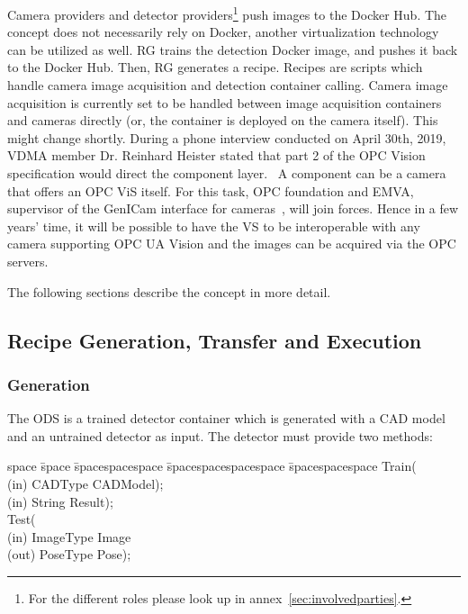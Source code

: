 Camera providers and detector providers\footnote{For the different roles please look up in annex~\ref{sec:involvedparties}.} push images to the Docker Hub.  The concept does not necessarily rely on Docker, another virtualization technology can be utilized as well. RG trains the detection Docker image, and pushes it back to the Docker Hub. Then, RG generates a recipe. Recipes are scripts which handle camera image acquisition and detection container calling. Camera image acquisition is currently set to be handled between image acquisition containers and cameras directly (or, the container is deployed on the camera itself). This might change shortly. During a phone interview conducted on April 30th, 2019, VDMA member Dr. Reinhard Heister stated that part 2 of the OPC Vision specification would direct the component layer.~\cite{Heister2019TheInterview} A component can be a camera that offers an OPC ViS itself. For this task, OPC foundation and EMVA, supervisor of the GenICam interface for cameras~\cite{EMVA2019GenICam2019}, will join forces. Hence in a few years' time, it will be possible to have the VS to be interoperable with any camera supporting OPC UA Vision and the images can be acquired via the OPC servers.

The following sections describe the concept in more detail.

\subsection{Recipe Generation, Transfer and Execution}
\subsubsection{Generation}
    The ODS is a trained detector container which is generated with a CAD model and an untrained detector as input. The detector must provide two methods:
\begin{minipage}{\linewidth}
\begin{tabbing}
    space \= space \= spacespacespace \= spacespacespacespace \= spacespacespace \kill
    \>  Train(\\
    \>  \>  (in)	 \> 	CADType          \> CADModel); \\
    \>  \>  (in)	 \> 	String          \> Result); \\
    \>  Test(\\
    \>  \>  (in)	 \> 	ImageType     \> Image\\
    \>  \>  (out)	 \> 	PoseType           \> Pose); 
\end{tabbing}\label{detectormethods}
\end{minipage}

